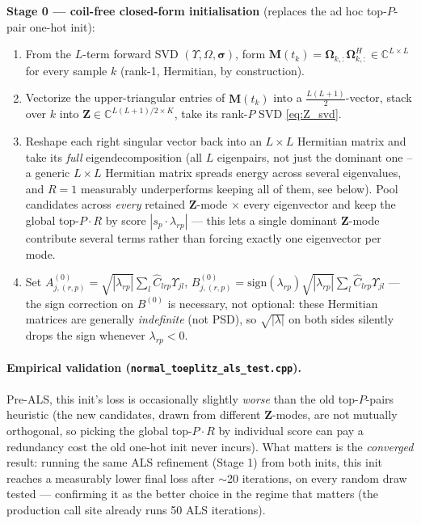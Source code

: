 \documentclass{article}
\begin{document}
\textbf{Stage 0 — coil-free closed-form initialisation} (replaces the ad hoc top-$P$-pair
one-hot init):
\begin{enumerate}[label=\arabic*.]
    \item From the $L$-term forward SVD $(\Upsilon,\Omega,\boldsymbol\sigma)$, form
          $\mathbf{M}(t_k)=\boldsymbol\Omega_{k,:}\boldsymbol\Omega_{k,:}^H\in\mathbb{C}^{L\times L}$
          for every sample $k$ (rank-1, Hermitian, by construction).
    \item Vectorize the upper-triangular entries of $\mathbf{M}(t_k)$ into a
          $\tfrac{L(L+1)}{2}$-vector, stack over $k$ into $\mathbf{Z}\in\mathbb{C}^{L(L+1)/2\times K}$,
          take its rank-$P$ SVD \eqref{eq:Z_svd}.
    \item Reshape each right singular vector back into an $L\times L$ Hermitian matrix and take
          its \emph{full} eigendecomposition (all $L$ eigenpairs, not just the dominant one --
          a generic $L\times L$ Hermitian matrix spreads energy across several eigenvalues, and
          $R=1$ measurably underperforms keeping all of them, see below). Pool candidates across
          \emph{every} retained $\mathbf{Z}$-mode $\times$ every eigenvector and keep the global
          top-$P\!\cdot\!R$ by score $|s_p\cdot\lambda_{rp}|$ — this lets a single dominant
          $\mathbf{Z}$-mode contribute several terms rather than forcing exactly one eigenvector
          per mode.
    \item Set $A^{(0)}_{j,(r,p)}=\sqrt{|\lambda_{rp}|}\sum_l\hat C_{lrp}\Upsilon_{jl}$,
          $B^{(0)}_{j,(r,p)}=\mathrm{sign}(\lambda_{rp})\sqrt{|\lambda_{rp}|}\sum_l\hat C_{lrp}\Upsilon_{jl}$
          — the sign correction on $B^{(0)}$ is necessary, not optional: these Hermitian
          matrices are generally \emph{indefinite} (not PSD), so $\sqrt{|\lambda|}$ on both sides
          silently drops the sign whenever $\lambda_{rp}<0$.
\end{enumerate}

\paragraph{Empirical validation (\texttt{normal\_toeplitz\_als\_test.cpp}).} Pre-ALS, this init's
loss is occasionally slightly \emph{worse} than the old top-$P$-pairs heuristic (the new
candidates, drawn from different $\mathbf{Z}$-modes, are not mutually orthogonal, so picking the
global top-$P\!\cdot\!R$ by individual score can pay a redundancy cost the old one-hot init never
incurs). What matters is the \emph{converged} result: running the same ALS refinement
(Stage 1) from both inits, this init reaches a measurably lower final loss after $\sim$20
iterations, on every random draw tested — confirming it as the better choice in the regime that
matters (the production call site already runs 50 ALS iterations).
\end{document}
